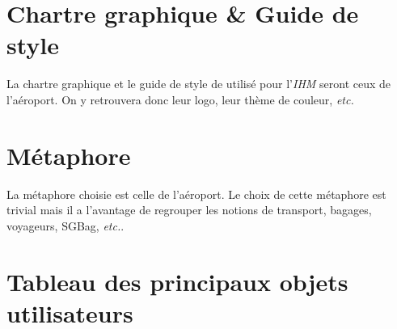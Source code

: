 \section{Chartre graphique \& Guide de style}
La chartre graphique et le guide de style de utilisé pour l'\textsl{IHM} seront ceux de l'aéroport. On y retrouvera donc leur logo, leur thème de couleur, \textsl{etc.}

\section{Métaphore}
La métaphore choisie est celle de \og l'aéroport\fg. Le choix de cette métaphore est trivial mais il a l'avantage de regrouper les notions de \og transport, bagages, voyageurs, SGBag, \textsl{etc.}\fg.

\section{Tableau des principaux objets utilisateurs}
\providecommand{\DJSPU}[1]{}

